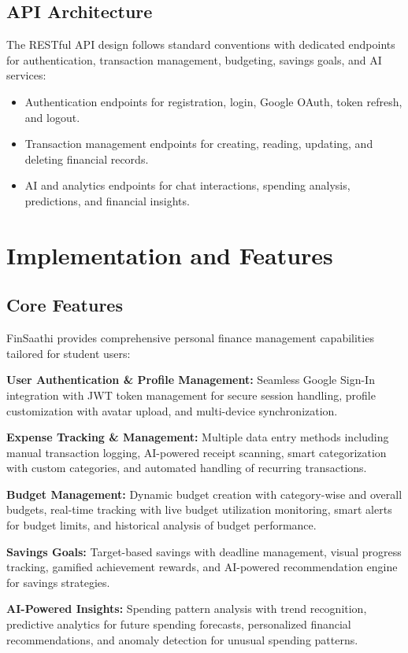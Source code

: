 \documentclass[10pt,twocolumn,twoside,a4paper]{article}
\begin{document}
\subsection{API Architecture}
The RESTful API design follows standard conventions with dedicated endpoints for authentication, transaction management, budgeting, savings goals, and AI services:
\begin{itemize}[leftmargin=*]
  \item Authentication endpoints for registration, login, Google OAuth, token refresh, and logout.
  \item Transaction management endpoints for creating, reading, updating, and deleting financial records.
  \item AI and analytics endpoints for chat interactions, spending analysis, predictions, and financial insights.
\end{itemize}

\section{Implementation and Features}
\subsection{Core Features}
FinSaathi provides comprehensive personal finance management capabilities tailored for student users:

\textbf{User Authentication \& Profile Management:} Seamless Google Sign-In integration with JWT token management for secure session handling, profile customization with avatar upload, and multi-device synchronization.

\textbf{Expense Tracking \& Management:} Multiple data entry methods including manual transaction logging, AI-powered receipt scanning, smart categorization with custom categories, and automated handling of recurring transactions.

\textbf{Budget Management:} Dynamic budget creation with category-wise and overall budgets, real-time tracking with live budget utilization monitoring, smart alerts for budget limits, and historical analysis of budget performance.

\textbf{Savings Goals:} Target-based savings with deadline management, visual progress tracking, gamified achievement rewards, and AI-powered recommendation engine for savings strategies.

\textbf{AI-Powered Insights:} Spending pattern analysis with trend recognition, predictive analytics for future spending forecasts, personalized financial recommendations, and anomaly detection for unusual spending patterns.
\end{document}
